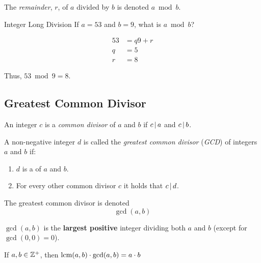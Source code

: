 \begin{definition}[Remainder]\label{def:Integer_Remainder}
  The \emph{remainder}, $r$, of $a$ divided by $b$ is denoted $a \bmod b$.
\end{definition}

\begin{example}[]{Integer Long Division}
  If $a=53$ and $b=9$, what is $a \bmod b$?

  \tcblower{}

  \begin{align*}
    53 &= q9 + r \\
    q &= 5 \\
    r &= 8
  \end{align*}

  Thus, $53 \bmod 9 = 8$.
\end{example}

\subsection{Greatest Common Divisor}\label{subsec:Greatest_Common_Divisor}
\begin{definition}\label{def:Common_Divisor}
  An integer $c$ is a \emph{common divisor} of $a$ and $b$ if $c \operatorname{\vert} a$ and $c \operatorname{\vert} b$.
\end{definition}

\begin{definition}\label{def:GCD}
  A non-negative integer $d$ is called the \emph{greatest common divisor} (\emph{GCD}) of integers $a$ and $b$ if:
  \begin{enumerate}[noitemsep]
  \item $d$ is a  of $a$ and $b$.
  \item For every other common divisor $c$ it holds that $c \operatorname{\vert} d$.
  \end{enumerate}

  The greatest common divisor is denoted
  \begin{equation}\label{eq:GCD}
    \gcd(a, b)
  \end{equation}

  $\gcd(a,b)$ is the \textbf{largest positive} integer dividing both $a$ and $b$ (except for $\gcd(0,0)=0$).
  
  \begin{remark}
    If $a, b \in \operatorname{\mathbb{Z}^{+}}$, then $\operatorname{\text{lcm}}(a, b) \cdot \gcd(a, b) = a \cdot b$
  \end{remark}
\end{definition}


